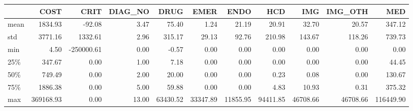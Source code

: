 \begin{tabular}{lrrrrrrrrrr}
\toprule
{} &       COST &       CRIT &  DIAG\_NO &      DRUG &      EMER &      ENDO &       HCD &       IMG &   IMG\_OTH &        MED \\
\midrule
mean &    1834.93 &     -92.08 &     3.47 &     75.40 &      1.24 &     21.19 &     20.91 &     32.70 &     20.57 &     347.12 \\
std  &    3771.16 &    1332.61 &     2.96 &    315.17 &     29.13 &     92.76 &    210.98 &    143.67 &    118.26 &     739.73 \\
min  &       4.50 & -250000.61 &     0.00 &     -0.57 &      0.00 &      0.00 &      0.00 &      0.00 &      0.00 &       0.00 \\
25\%  &     347.67 &       0.00 &     1.00 &      7.18 &      0.00 &      0.00 &      0.00 &      0.00 &      0.00 &      44.45 \\
50\%  &     749.49 &       0.00 &     2.00 &     20.00 &      0.00 &      0.00 &      0.23 &      0.08 &      0.00 &     130.67 \\
75\%  &    1886.38 &       0.00 &     5.00 &     59.88 &      0.00 &      0.00 &      4.83 &     10.93 &      0.31 &     375.32 \\
max  &  369168.93 &       0.00 &    13.00 &  63430.52 &  33347.89 &  11855.95 &  94411.85 &  46708.66 &  46708.66 &  116449.90 \\
\bottomrule
\end{tabular}
